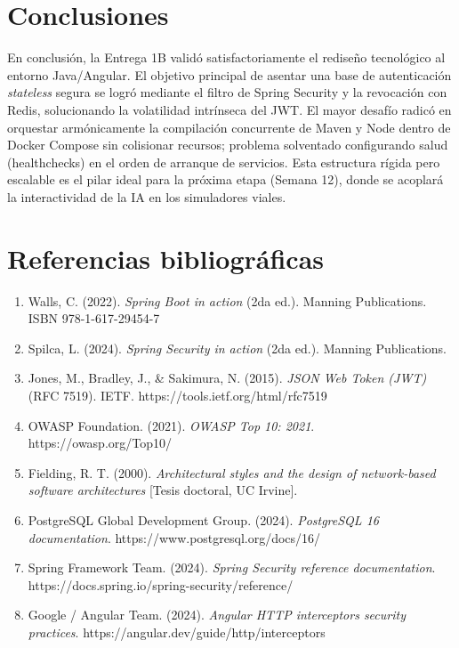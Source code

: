 \documentclass[12pt]{article}
\begin{document}
\section{Conclusiones}
En conclusión, la Entrega 1B validó satisfactoriamente el rediseño tecnológico al entorno Java/Angular. El objetivo principal de asentar una base de autenticación \textit{stateless} segura se logró mediante el filtro de Spring Security y la revocación con Redis, solucionando la volatilidad intrínseca del JWT. El mayor desafío radicó en orquestar armónicamente la compilación concurrente de Maven y Node dentro de Docker Compose sin colisionar recursos; problema solventado configurando salud (healthchecks) en el orden de arranque de servicios. Esta estructura rígida pero escalable es el pilar ideal para la próxima etapa (Semana 12), donde se acoplará la interactividad de la IA en los simuladores viales.

\section{Referencias bibliográficas}
\begin{enumerate}
    \item Walls, C. (2022). \textit{Spring Boot in action} (2da ed.). Manning Publications. ISBN 978-1-617-29454-7
    \item Spilca, L. (2024). \textit{Spring Security in action} (2da ed.). Manning Publications.
    \item Jones, M., Bradley, J., \& Sakimura, N. (2015). \textit{JSON Web Token (JWT)} (RFC 7519). IETF. https://tools.ietf.org/html/rfc7519
    \item OWASP Foundation. (2021). \textit{OWASP Top 10: 2021}. https://owasp.org/Top10/
    \item Fielding, R. T. (2000). \textit{Architectural styles and the design of network-based software architectures} [Tesis doctoral, UC Irvine].
    \item PostgreSQL Global Development Group. (2024). \textit{PostgreSQL 16 documentation}. https://www.postgresql.org/docs/16/
    \item Spring Framework Team. (2024). \textit{Spring Security reference documentation}. https://docs.spring.io/spring-security/reference/
    \item Google / Angular Team. (2024). \textit{Angular HTTP interceptors security practices}. https://angular.dev/guide/http/interceptors
\end{enumerate}
\end{document}
